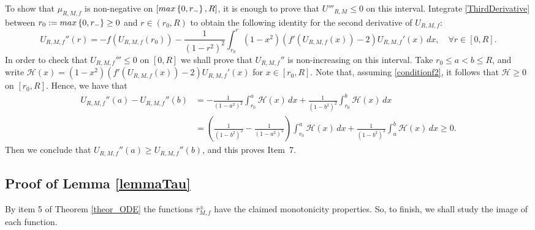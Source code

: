 \documentclass[11pt]{article}
\newcommand{\set}[1]{\left\{#1\right\}}
\numberwithin{equation} {section}
\begin{document}
To show that $\mu_{R,M,f}$ is non-negative on $[{\rm max}\set{0,r_-} ,R]$, it is enough to prove that $U'''_{R,M} \leq 0$ on this interval. Integrate \eqref{ThirdDerivative} between $r_0 :={\rm max}\set{0,r_-} \geq 0$ and $r \in (r_0 ,R)$ to obtain the following identity for the second derivative of $U_{R,M,f}$:
	\[
	U_{R,M,f}'' (r) = -f(U_{R,M,f} (r_0))-\frac{1}{(1-r^2)^{2}} \int_{r_0}^r (1-x^2) \left(f' (U_{R,M,f} (x))-2\right) U_{R,M,f}' (x) \, dx , \quad \forall r \in [0,R].
	\]
In order to check that $U_{R,M,f}''' \leq 0$ on $[0,R]$ we shall prove that $U_{R,M,f}''$ is non-increasing on this interval. Take $r_0 \leq a < b \leq R$, and write $\mathcal H(x)=(1-x^2) \left(f' (U_{R,M,f} (x))-2\right)U_{R,M,f}' (x)$ for $x \in [r_0,R]$. Note that, assuming \eqref{conditionf2}, it follows that $\mathcal H \geq 0$ on $[r_0,R]$. Hence, we have that
	\[
	\begin{split}
			U_{R,M,f}'' (a)-U_{R,M,f}'' (b) &= -\frac{1}{(1-a^2)^2}  \int_{r_0}^a \mathcal H(x) \, dx + \frac{1}{(1-b^2)^2}  \int_{r_0}^b \mathcal H(x) \, dx \\
			&= \left( \frac{1}{(1-b^2)^2}-\frac{1}{(1-a^2)^2} \right) \int_{r_0}^a \mathcal H(x) \, dx + \frac{1}{(1-b^2)^2}  \int_{a}^b \mathcal H(x) \, dx  \geq 0.
	\end{split}
	\]
	Then we conclude that $U_{R,M,f}'' (a) \geq U_{R,M,f}'' (b)$, and this proves Item~7.

\subsection{Proof of Lemma \ref{lemmaTau}}\label{Appendix_lemmaTau}

By item 5 of Theorem \ref{theor_ODE} the functions $\overline{\tau}_{M,f}^\pm$ have the claimed monotonicity properties. So, to finish, we shall study the image of each function. 
\end{document}
